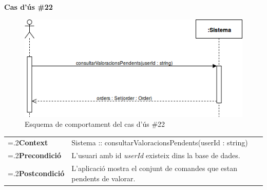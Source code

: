 \noindent\textbf{\large Cas d'ús \#22}\\
\begin{figure}[H]
\centering
\includegraphics[scale=0.6]{Figures/casdus_22.png}
\caption{Esquema de comportament del cas d'ús \#22}
\end{figure}
\begin{table}[h]
\noindent
\begin{tabularx}{\linewidth}{
>{\hsize=.2\hsize}X%
>{\hsize=0.8\hsize}X%
}
\textbf{Context} 		& Sistema :: consultarValoracionsPendents(userId : string) \\
\textbf{Precondició} 	& L'usuari amb id \textit{userId} existeix dins la base de dades. \\
\textbf{Postcondició}	& L'aplicació mostra el conjunt de comandes que estan pendents de valorar. \\
\end{tabularx}
\label{}
\end{table}

